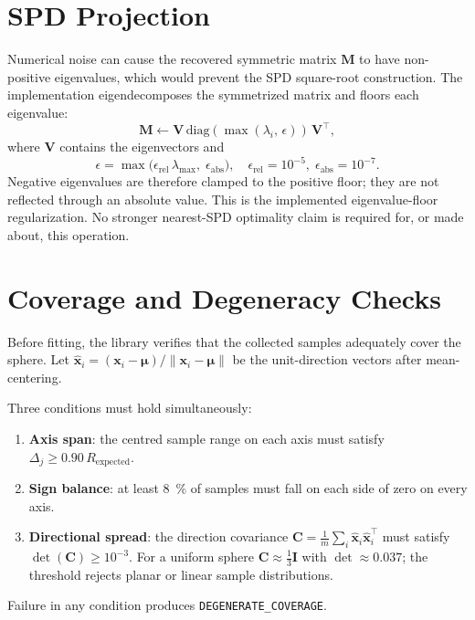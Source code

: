 \documentclass[conference]{IEEEtran}
\begin{document}
    \section{SPD Projection}
    \label{sec:spd}

    Numerical noise can cause the recovered symmetric matrix $\mathbf{M}$ to
    have non-positive eigenvalues, which would prevent the SPD square-root
    construction.  The implementation eigendecomposes the symmetrized matrix
    and floors each eigenvalue:
    \begin{equation}
        \mathbf{M} \leftarrow \mathbf{V}\,
        \mathrm{diag}\!\left(\max(\lambda_i,\,\epsilon)\right)\,
        \mathbf{V}^\top ,
    \end{equation}
    where $\mathbf{V}$ contains the eigenvectors and
    \begin{equation}
        \epsilon = \max\!\bigl(\epsilon_\text{rel}\,\lambda_\text{max},\;
        \epsilon_\text{abs}\bigr),
        \quad
        \epsilon_\text{rel} = 10^{-5},\;
        \epsilon_\text{abs} = 10^{-7}.
    \end{equation}
    Negative eigenvalues are therefore clamped to the positive floor; they are
    not reflected through an absolute value.  This is the implemented
    eigenvalue-floor regularization.  No stronger nearest-SPD optimality claim
    is required for, or made about, this operation.

    \section{Coverage and Degeneracy Checks}
    \label{sec:coverage}

    Before fitting, the library verifies that the collected samples
    adequately cover the sphere.
    Let $\hat{\mathbf{x}}_i = (\mathbf{x}_i - \boldsymbol{\mu})/
    \|\mathbf{x}_i - \boldsymbol{\mu}\|$ be the unit-direction vectors
    after mean-centering.

    Three conditions must hold simultaneously:
    \begin{enumerate}
        \item \textbf{Axis span}: the centred sample range on each axis
        must satisfy $\Delta_j \ge 0.90\,R_\text{expected}$.
        \item \textbf{Sign balance}: at least \SI{8}{\percent} of samples
        must fall on each side of zero on every axis.
        \item \textbf{Directional spread}: the direction covariance
        $\mathbf{C} = \frac{1}{m}\sum_i \hat{\mathbf{x}}_i
        \hat{\mathbf{x}}_i^\top$
        must satisfy $\det(\mathbf{C}) \ge 10^{-3}$.
        For a uniform sphere $\mathbf{C} \approx \tfrac{1}{3}\mathbf{I}$
        with $\det \approx 0.037$; the threshold rejects planar or
        linear sample distributions.
    \end{enumerate}
    Failure in any condition produces \texttt{DEGENERATE\_COVERAGE}.
\end{document}
